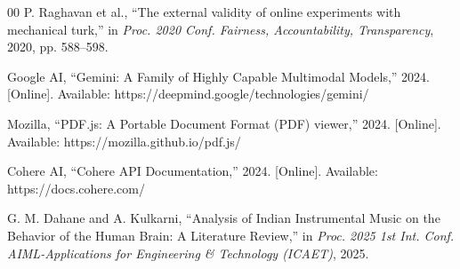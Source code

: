 \documentclass[conference]{IEEEtran}
\begin{document}
\begin{thebibliography}{00}
 P. Raghavan et al., ``The external validity of online experiments with mechanical turk,'' in \textit{Proc. 2020 Conf. Fairness, Accountability, Transparency}, 2020, pp. 588--598.

 Google AI, ``Gemini: A Family of Highly Capable Multimodal Models,'' 2024. [Online]. Available: https://deepmind.google/technologies/gemini/

 Mozilla, ``PDF.js: A Portable Document Format (PDF) viewer,'' 2024. [Online]. Available: https://mozilla.github.io/pdf.js/

 Cohere AI, ``Cohere API Documentation,'' 2024. [Online]. Available: https://docs.cohere.com/

 G. M. Dahane and A. Kulkarni, ``Analysis of Indian Instrumental Music on the Behavior of the Human Brain: A Literature Review,'' in \textit{Proc. 2025 1st Int. Conf. AIML-Applications for Engineering \& Technology (ICAET)}, 2025.

\end{thebibliography}
\end{document}
